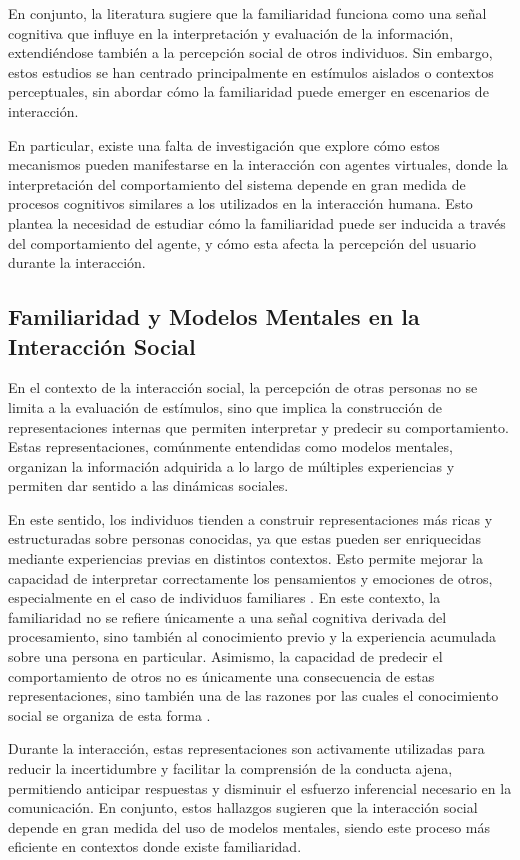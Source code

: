 \documentclass[12pt]{article}
\begin{document}
En conjunto, la literatura sugiere que la familiaridad funciona como una señal cognitiva que influye en la interpretación y evaluación de la información, extendiéndose también a la percepción social de otros individuos. Sin embargo, estos estudios se han centrado principalmente en estímulos aislados o contextos perceptuales, sin abordar cómo la familiaridad puede emerger en escenarios de interacción.

En particular, existe una falta de investigación que explore cómo estos mecanismos pueden manifestarse en la interacción con agentes virtuales, donde la interpretación del comportamiento del sistema depende en gran medida de procesos cognitivos similares a los utilizados en la interacción humana. Esto plantea la necesidad de estudiar cómo la familiaridad puede ser inducida a través del comportamiento del agente, y cómo esta afecta la percepción del usuario durante la interacción.

\subsection{Familiaridad y Modelos Mentales en la Interacción Social}


En el contexto de la interacción social, la percepción de otras personas no se limita a la evaluación de estímulos, sino que implica la construcción de representaciones internas que permiten interpretar y predecir su comportamiento. Estas representaciones, comúnmente entendidas como modelos mentales, organizan la información adquirida a lo largo de múltiples experiencias y permiten dar sentido a las dinámicas sociales.

En este sentido, los individuos tienden a construir representaciones más ricas y estructuradas sobre personas conocidas, ya que estas pueden ser enriquecidas mediante experiencias previas en distintos contextos. Esto permite mejorar la capacidad de interpretar correctamente los pensamientos y emociones de otros, especialmente en el caso de individuos familiares \cite{stinson_empathic_nodate}. En este contexto, la familiaridad no se refiere únicamente a una señal cognitiva derivada del procesamiento, sino también al conocimiento previo y la experiencia acumulada sobre una persona en particular. Asimismo, la capacidad de predecir el comportamiento de otros no es únicamente una consecuencia de estas representaciones, sino también una de las razones por las cuales el conocimiento social se organiza de esta forma \cite{tamir_predicting_2024}.

Durante la interacción, estas representaciones son activamente utilizadas para reducir la incertidumbre y facilitar la comprensión de la conducta ajena, permitiendo anticipar respuestas y disminuir el esfuerzo inferencial necesario en la comunicación. En conjunto, estos hallazgos sugieren que la interacción social depende en gran medida del uso de modelos mentales, siendo este proceso más eficiente en contextos donde existe familiaridad.
\end{document}
